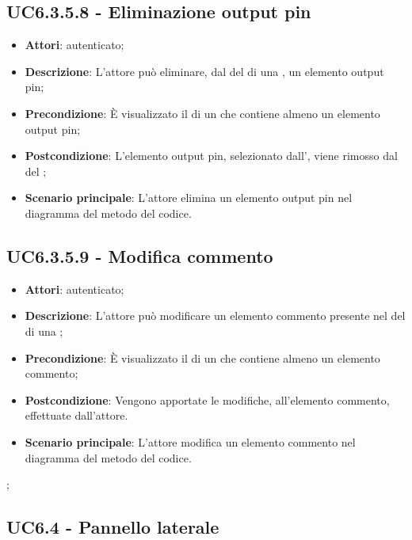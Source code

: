 \subsection{UC6.3.5.8 - Eliminazione output pin}
\label{ssec:UC6.3.5.8}
\begin{itemize}
\item \textbf{Attori}:  autenticato;
\item \textbf{Descrizione}: L'attore può eliminare, dal  del  di una , un elemento output pin;
\item \textbf{Precondizione}: È visualizzato il  di un  che contiene almeno un elemento output pin;
\item \textbf{Postcondizione}: L'elemento output pin, selezionato dall', viene rimosso dal  del ;
\item \textbf{Scenario principale}: L'attore elimina un elemento output pin nel diagramma del metodo del codice.
\end{itemize}
\subsection{UC6.3.5.9 - Modifica commento}
\label{ssec:UC6.3.5.9}
\begin{itemize}
\item \textbf{Attori}:  autenticato;
\item \textbf{Descrizione}: L'attore può modificare un elemento commento presente nel  del  di una ;
\item \textbf{Precondizione}: È visualizzato il  di un  che contiene almeno un elemento commento;
\item \textbf{Postcondizione}: Vengono apportate le modifiche, all'elemento commento, effettuate dall'attore.
\item \textbf{Scenario principale}: L'attore modifica un elemento commento nel diagramma del metodo del codice.
\end{itemize};
\newpage
\subsection{UC6.4 - Pannello laterale}
\label{ssec:UC6.4}

